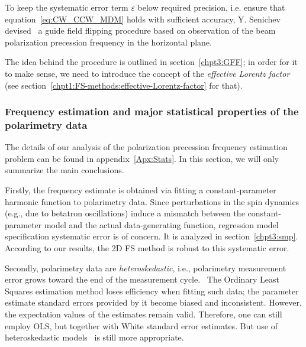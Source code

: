 To keep the systematic error term $\varepsilon$ below required precision, i.e. ensure
that equation~\eqref{eq:CW_CCW_MDM} holds with sufficient accuracy, Y. Senichev 
devised~\cite{Senichev:FDM} a guide field flipping procedure
based on observation of the beam polarization precession frequency in the horizontal plane.

The idea behind the procedure is outlined in section~\ref{chpt3:GFF}; in order for it to make sense, we need
to introduce the concept of the \emph{effective Lorentz factor}
(see section~\ref{chpt1:FS-methods:effective-Lorentz-factor} for that).

\subsubsection{Frequency estimation and major statistical properties of the polarimetry data}
The details of our analysis of the polarization precession frequency estimation problem can be found in
 appendix~\ref{Apx:Stats}. In this section, we will only summarize the main conclusions.

Firstly, the frequency estimate is obtained via fitting a constant-parameter harmonic function
to polarimetry data. Since perturbations in the spin dynamics (e.g., due to betatron oscillations) 
induce a mismatch between the constant-parameter model and the actual data-generating function, 
regression model specification systematic error is of concern. It is analyzed 
in section~\ref{chpt3:smp}. According to our results, the 2D FS method is robust to this 
systematic error.

Secondly, polarimetry data are \emph{heteroskedastic}, i.e., polarimetry measurement error grows
toward the end of the measurement cycle.~\cite{Eversmann:Thesis} The Ordinary Least Squares estimation method
loses efficiency when fitting such data; the parameter estimate standard errors provided by it
become biased and inconsistent. However, the expectation values of the estimates remain valid. 
Therefore, one can still employ OLS, but together with White standard error estimates.
But use of heteroskedastic models~\cite{Stats:R:NLREG, Stats:HeteroskedasticNRM} is still more appropriate.


